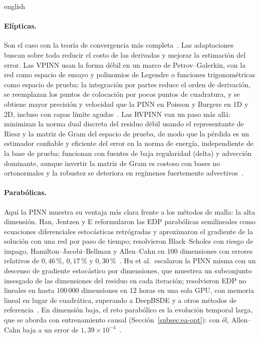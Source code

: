 \documentclass[../0000.tex]{subfiles}
\begin{document}
\begin{hyphenrules}{english}
\paragraph{Elípticas.} Son el caso con la teoría de convergencia más completa~\cite{shin2020convergence,doumeche2025convergence}. Las adaptaciones buscan sobre todo reducir el costo de las derivadas y mejorar la estimación del error. Las VPINN usan la forma débil en un marco de Petrov--Galerkin, con la red como espacio de ensayo y polinomios de Legendre o funciones trigonométricas como espacio de prueba: la integración por partes reduce el orden de derivación, se reemplazan los puntos de colocación por pocos puntos de cuadratura, y se obtiene mayor precisión y velocidad que la PINN en Poisson y Burgers en 1D y 2D, incluso con capas límite agudas~\cite{kharazmi2019vpinns}. Las RVPINN van un paso más allá: minimizan la norma dual discreta del residuo débil usando el representante de Riesz y la matriz de Gram del espacio de prueba, de modo que la pérdida es un estimador confiable y eficiente del error en la norma de energía, independiente de la base de prueba; funcionan con fuentes de baja regularidad (delta) y advección dominante, aunque invertir la matriz de Gram es costoso con bases no ortonormales y la robustez se deteriora en regímenes fuertemente advectivos~\cite{rojas2024robust}.

\paragraph{Parabólicas.} Aquí la PINN muestra su ventaja más clara frente a los métodos de malla: la alta dimensión. Han, Jentzen y E reformularon las EDP parabólicas semilineales como ecuaciones diferenciales estocásticas retrógradas y aproximaron el gradiente de la solución con una red por paso de tiempo; resolvieron Black--Scholes con riesgo de impago, Hamilton--Jacobi--Bellman y Allen--Cahn en 100 dimensiones con errores relativos de $0{,}46\,\%$, $0{,}17\,\%$ y $0{,}30\,\%$~\cite{han2018solving}. Hu et al.\ escalaron la PINN misma con un descenso de gradiente estocástico por dimensiones, que muestrea un subconjunto insesgado de las dimensiones del residuo en cada iteración; resolvieron EDP no lineales en hasta $100\,000$ dimensiones en 12 horas en una sola GPU, con memoria lineal en lugar de cuadrática, superando a DeepBSDE y a otros métodos de referencia~\cite{hu2024tackling}. En dimensión baja, el reto parabólico es la evolución temporal larga, que se aborda con entrenamiento causal (Sección~\ref{subsec:ea-opt}): con él, Allen--Cahn baja a un error de $1{,}39\times10^{-4}$~\cite{wang2022respecting}.


\end{hyphenrules}
\end{document}
